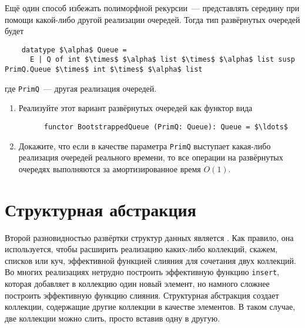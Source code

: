 \begin{exercise}\label{ex:10.5}
  Ещё один способ избежать полиморфной рекурсии~--- представлять
  середину при помощи какой-либо другой реализации очередей. Тогда тип
  развёрнутых очередей будет
  \begin{lstlisting}
    datatype $\alpha$ Queue =
      E | Q of int $\times$ $\alpha$ list $\times$ $\alpha$ list susp PrimQ.Queue $\times$ int $\times$ $\alpha$ list
  \end{lstlisting}
  где \lstinline!PrimQ!~--- другая реализация очередей.
  \begin{enumerate}
  \item Реализуйте этот вариант развёрнутых очередей как функтор вида
    \begin{lstlisting}
      functor BootstrappedQueue (PrimQ: Queue): Queue = $\ldots$
    \end{lstlisting}
  \item Докажите, что если в качестве параметра \lstinline!PrimQ!
    выступает какая-либо реализация очередей реального времени, то все
    операции на развёрнутых очередях выполняются за амортизированное
    время $O(1)$.
  \end{enumerate}
\end{exercise}

\section{Структурная абстракция}
\label{sc:10.2}

Второй разновидностью развёртки структур данных является
. Как правило,
она используется, чтобы расширить реализацию каких-либо коллекций,
скажем, списков или куч, эффективной функцией слияния для сочетания
двух коллекций. Во многих реализациях нетрудно построить эффективную
функцию \lstinline!insert!, которая добавляет в коллекцию один новый
элемент, но намного сложнее построить эффективную функцию
слияния. Структурная абстракция создает коллекции, содержащие другие
коллекции в качестве элементов. В таком случае, две коллекции можно
слить, просто вставив одну в другую.

